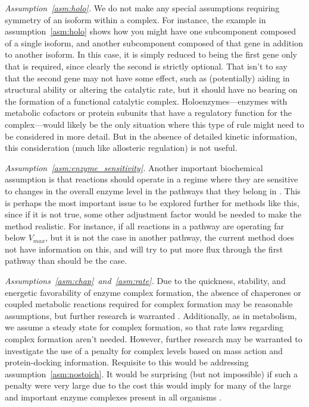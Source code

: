 \emph{Assumption~\ref{asm:holo}.}
We do not make any special assumptions requiring symmetry of an
isoform within a complex. For instance, the example in
assumption~\ref{asm:holo} shows how you might have one subcomponent
composed of a single isoform, and another subcomponent composed of
that gene in addition to another isoform. In this case, it is simply
reduced to being the first gene only that is required, since clearly
the second is strictly optional. That isn't to say that the second
gene may not have some effect, such as (potentially) aiding in
structural ability or altering the catalytic rate, but it should have
no bearing on the formation of a functional catalytic
complex. Holoenzymes---enzymes with metabolic cofactors or protein
subunits that have a regulatory function for the complex---would
likely be the only situation where this type of rule might need to be
considered in more detail. But in the absence of detailed kinetic
information, this consideration (much like allosteric
regulation) is not useful.

\emph{Assumption~\ref{asm:enzyme_sensitivity}.}
Another important biochemical assumption is that reactions should
operate in a regime where they are sensitive to changes in the overall
enzyme level in the pathways that they belong in
\citep{Bennett2009,Chubukov2013}. This is perhaps the most important
issue to be explored further for methods like this, since if it is not
true, some other adjustment factor would be needed to make the method
realistic. For instance, if all reactions in a pathway are operating
far below $V_{max}$, but it is not the case in another pathway, the
current method does not have information on this, and will try to put
more flux through the first pathway than should be the case.

\emph{Assumptions~\ref{asm:chap}~and~\ref{asm:rate}.}
Due to the quickness, stability, and energetic favorability of enzyme
complex formation, the absence of chaperones or coupled metabolic
reactions required for complex formation may be reasonable
assumptions, but further research is warranted \citep{Karr2012}.
Additionally, as in metabolism, we assume a steady state for complex
formation, so that rate laws regarding complex formation aren't
needed. However, further research may be warranted to investigate the
use of a penalty for complex levels based on mass action and
protein-docking information. Requisite to this would be addressing
assumption~\ref{asm:nostoich}. It would be surprising (but not
impossible) if such a penalty were very large due to the cost this
would imply for many of the large and important enzyme complexes
present in all organisms \citep{Nelson2008}.

